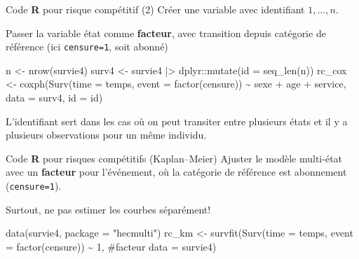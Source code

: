 \documentclass[
  ignorenonframetext,
]{beamer}
\newenvironment{Shaded}{\begin{snugshade}}{\end{snugshade}}
\newcommand{\AttributeTok}[1]{\textcolor[rgb]{0.40,0.45,0.13}{#1}}
\newcommand{\CommentTok}[1]{\textcolor[rgb]{0.37,0.37,0.37}{#1}}
\newcommand{\DecValTok}[1]{\textcolor[rgb]{0.68,0.00,0.00}{#1}}
\newcommand{\FunctionTok}[1]{\textcolor[rgb]{0.28,0.35,0.67}{#1}}
\newcommand{\NormalTok}[1]{\textcolor[rgb]{0.00,0.23,0.31}{#1}}
\newcommand{\OtherTok}[1]{\textcolor[rgb]{0.00,0.23,0.31}{#1}}
\newcommand{\SpecialCharTok}[1]{\textcolor[rgb]{0.37,0.37,0.37}{#1}}
\newcommand{\StringTok}[1]{\textcolor[rgb]{0.13,0.47,0.30}{#1}}
\begin{document}
\begin{frame}[fragile]{Code \textbf{R} pour risque compétitif (2)}
\protect\hypertarget{code-r-pour-risque-compuxe9titif-2}{}
Créer une variable avec identifiant \(1, \ldots, n\).

Passer la variable état comme \textbf{facteur}, avec transition depuis
catégorie de référence (ici \texttt{censure=1}, soit abonné)

\begin{Shaded}
\begin{Highlighting}[numbers=left,,]
\NormalTok{n }\OtherTok{\textless{}{-}} \FunctionTok{nrow}\NormalTok{(survie4)}
\NormalTok{surv4 }\OtherTok{\textless{}{-}}\NormalTok{ survie4 }\SpecialCharTok{|\textgreater{}} 
\NormalTok{  dplyr}\SpecialCharTok{::}\FunctionTok{mutate}\NormalTok{(}\AttributeTok{id =} \FunctionTok{seq\_len}\NormalTok{(n))}
\NormalTok{rc\_cox }\OtherTok{\textless{}{-}} \FunctionTok{coxph}\NormalTok{(}\FunctionTok{Surv}\NormalTok{(}\AttributeTok{time =}\NormalTok{ temps, }
             \AttributeTok{event =} \FunctionTok{factor}\NormalTok{(censure)) }\SpecialCharTok{\textasciitilde{}} 
\NormalTok{               sexe }\SpecialCharTok{+}\NormalTok{ age }\SpecialCharTok{+}\NormalTok{ service,}
             \AttributeTok{data =}\NormalTok{ surv4,}
             \AttributeTok{id =}\NormalTok{ id)}
\end{Highlighting}
\end{Shaded}

\footnotesize

L'identifiant sert dans les cas où on peut transiter entre plusieurs
états et il y a plusieurs observations pour un même individu.
\end{frame}

\begin{frame}[fragile]{Code \textbf{R} pour risques compétitifs
(Kaplan--Meier)}
\protect\hypertarget{code-r-pour-risques-compuxe9titifs-kaplanmeier}{}
Ajuster le modèle multi-état avec un \textbf{facteur} pour l'événement,
où la catégorie de référence est abonnement (\texttt{censure=1}).

Surtout, ne pas estimer les courbes séparément!

\begin{Shaded}
\begin{Highlighting}[numbers=left,,]
\FunctionTok{data}\NormalTok{(survie4, }\AttributeTok{package =} \StringTok{"hecmulti"}\NormalTok{)}
\NormalTok{rc\_km }\OtherTok{\textless{}{-}} \FunctionTok{survfit}\NormalTok{(}\FunctionTok{Surv}\NormalTok{(}\AttributeTok{time =}\NormalTok{ temps, }
             \AttributeTok{event =} \FunctionTok{factor}\NormalTok{(censure)) }\SpecialCharTok{\textasciitilde{}} \DecValTok{1}\NormalTok{, }\CommentTok{\#facteur}
             \AttributeTok{data =}\NormalTok{ survie4)}
\end{Highlighting}
\end{Shaded}
\end{frame}
\end{document}
